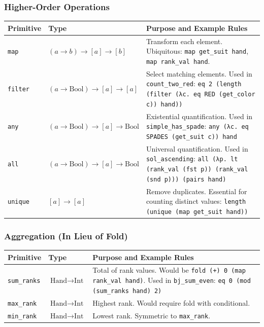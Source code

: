 \documentclass[11pt]{article}
\begin{document}
\subsubsection{Higher-Order Operations}

\begin{center}
\begin{tabular}{llp{7cm}}
\toprule
\textbf{Primitive} & \textbf{Type} & \textbf{Purpose and Example Rules} \\
\midrule
\texttt{map} & $(a \to b) \to [a] \to [b]$ & Transform each element. Ubiquitous: \texttt{map get\_suit hand}, \texttt{map rank\_val hand}. \\
\texttt{filter} & $(a \to \text{Bool}) \to [a] \to [a]$ & Select matching elements. Used in \texttt{count\_two\_red}: \texttt{eq 2 (length (filter (λc. eq RED (get\_color c)) hand))} \\
\texttt{any} & $(a \to \text{Bool}) \to [a] \to \text{Bool}$ & Existential quantification. Used in \texttt{simple\_has\_spade}: \texttt{any (λc. eq SPADES (get\_suit c)) hand} \\
\texttt{all} & $(a \to \text{Bool}) \to [a] \to \text{Bool}$ & Universal quantification. Used in \texttt{sol\_ascending}: \texttt{all (λp. lt (rank\_val (fst p)) (rank\_val (snd p))) (pairs hand)} \\
\texttt{unique} & $[a] \to [a]$ & Remove duplicates. Essential for counting distinct values: \texttt{length (unique (map get\_suit hand))} \\
\bottomrule
\end{tabular}
\end{center}

\subsubsection{Aggregation (In Lieu of Fold)}

\begin{center}
\begin{tabular}{llp{7cm}}
\toprule
\textbf{Primitive} & \textbf{Type} & \textbf{Purpose and Example Rules} \\
\midrule
\texttt{sum\_ranks} & $\text{Hand} \to \text{Int}$ & Total of rank values. Would be \texttt{fold (+) 0 (map rank\_val hand)}. Used in \texttt{bj\_sum\_even}: \texttt{eq 0 (mod (sum\_ranks hand) 2)} \\
\texttt{max\_rank} & $\text{Hand} \to \text{Int}$ & Highest rank. Would require fold with conditional. \\
\texttt{min\_rank} & $\text{Hand} \to \text{Int}$ & Lowest rank. Symmetric to \texttt{max\_rank}. \\
\bottomrule
\end{tabular}
\end{center}
\end{document}

